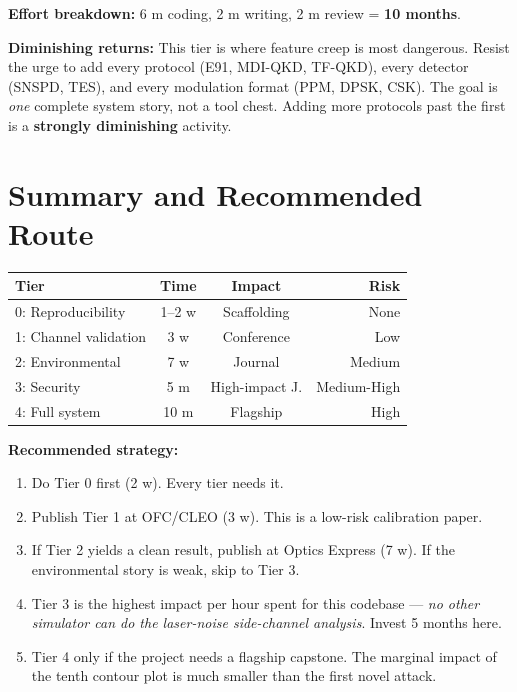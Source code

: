 \documentclass[11pt,a4paper]{article}
\begin{document}
\vspace{4pt}
\noindent\textbf{Effort breakdown:} 6 m coding, 2 m writing, 2 m review = \textbf{10 months}.

\vspace{4pt}
\noindent\textbf{Diminishing returns:} This tier is where feature creep is most dangerous.
Resist the urge to add every protocol (E91, MDI-QKD, TF-QKD), every detector (SNSPD, TES),
and every modulation format (PPM, DPSK, CSK).  The goal is \emph{one} complete system story,
not a tool chest.  Adding more protocols past the first is a \textbf{strongly diminishing}
activity.

\newpage

\section{Summary and Recommended Route}

\begin{center}
\begin{tabular}{lccr}
\toprule
\textbf{Tier} & \textbf{Time} & \textbf{Impact} & \textbf{Risk} \\
\midrule
0: Reproducibility    & 1--2 w   & Scaffolding    & None \\
1: Channel validation & 3 w      & Conference     & Low \\
2: Environmental      & 7 w      & Journal        & Medium \\
3: Security           & 5 m      & High-impact J. & Medium-High \\
4: Full system        & 10 m     & Flagship       & High \\
\bottomrule
\end{tabular}
\end{center}

\vspace{12pt}
\noindent\textbf{Recommended strategy:}
\begin{enumerate}[nosep]
    \item Do Tier 0 first (2 w).  Every tier needs it.
    \item Publish Tier 1 at OFC/CLEO (3 w).  This is a low-risk calibration paper.
    \item If Tier 2 yields a clean result, publish at Optics Express (7 w).
          If the environmental story is weak, skip to Tier 3.
    \item Tier 3 is the highest impact per hour spent for this codebase ---
          \emph{no other simulator can do the laser-noise side-channel analysis}.
          Invest 5 months here.
    \item Tier 4 only if the project needs a flagship capstone.  The marginal impact
          of the tenth contour plot is much smaller than the first novel attack.
\end{enumerate}
\end{document}
